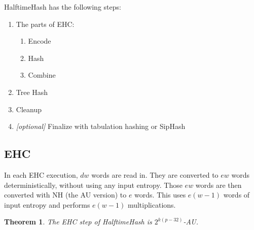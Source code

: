 \documentclass[acmsmall, nonacm]{acmart}
\newtheorem{theorem}{Theorem}
\begin{document}
HalftimeHash has the following steps:

\begin{enumerate}
\item The parts of EHC:
  \begin {enumerate}
  \item Encode
  \item Hash
  \item Combine
  \end{enumerate}
\item Tree Hash
\item Cleanup
\item{} {\em [optional]} Finalize with tabulation hashing or SipHash
\end{enumerate}

\subsection{EHC}

In each EHC execution, $dw$ words are read in.
They are converted to $ew$ words deterministically, without using any input entropy.
Those $ew$ words are then converted with NH (the AU version) to $e$ words.
This uses $e(w - 1)$ words of input entropy and performs $e(w - 1)$ multiplications.

\begin{theorem}
  The EHC step of HalftimeHash is $2^{k(p-32)}$-AU.
\end{theorem}
\end{document}
